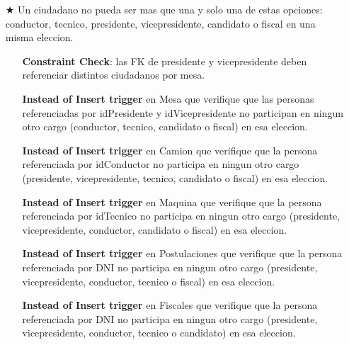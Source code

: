 \vspace{1.2cm}
\begin{itemize}
		\item[$\bigstar$] Un ciudadano no pueda ser mas que una y solo una de estas opciones: conductor, tecnico, presidente, vicepresidente, candidato o fiscal en una misma eleccion.
		\begin{itemize}
			\item[\Checkmark] \textbf{Constraint Check}: las FK de presidente y vicepresidente deben referenciar distintos ciudadanos por mesa.
			
			\item[\Checkmark] \textbf{Instead of Insert trigger} en Mesa que verifique que las personas referenciadas por idPresidente y idVicepresidente no participan en ningun otro cargo (conductor, tecnico, candidato o fiscal) en esa eleccion.
			
			\item[\Checkmark] \textbf{Instead of Insert trigger} en Camion que verifique que la persona referenciada por idConductor no participa en ningun otro cargo (presidente, vicepresidente, tecnico, candidato o fiscal) en esa eleccion.

			\item[\Checkmark] \textbf{Instead of Insert trigger} en Maquina que verifique que la persona referenciada por idTecnico no participa en ningun otro cargo (presidente, vicepresidente, conductor, candidato o fiscal) en esa eleccion.

			\item[\Checkmark] \textbf{Instead of Insert trigger} en Postulaciones que verifique que la persona referenciada por DNI no participa en ningun otro cargo (presidente, vicepresidente, conductor, tecnico o fiscal) en esa eleccion.

			\item[\Checkmark] \textbf{Instead of Insert trigger} en Fiscales que verifique que la persona referenciada por DNI no participa en ningun otro cargo (presidente, vicepresidente, conductor, tecnico o candidato) en esa eleccion.
		\end{itemize}	
\end{itemize}
\vspace{1.2cm}
